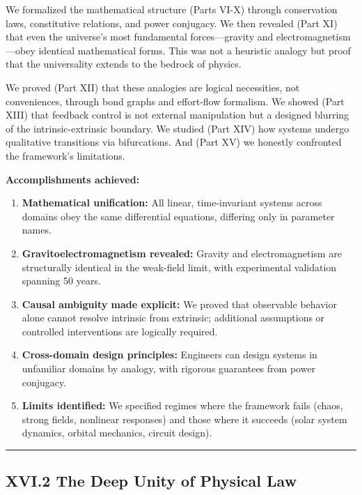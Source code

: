 \documentclass[
]{article}
\begin{document}
We formalized the mathematical structure (Parts VI-X) through
conservation laws, constitutive relations, and power conjugacy. We then
revealed (Part XI) that even the universe's most fundamental
forces---gravity and electromagnetism---obey identical mathematical
forms. This was not a heuristic analogy but proof that the universality
extends to the bedrock of physics.

We proved (Part XII) that these analogies are logical necessities, not
conveniences, through bond graphs and effort-flow formalism. We showed
(Part XIII) that feedback control is not external manipulation but a
designed blurring of the intrinsic-extrinsic boundary. We studied (Part
XIV) how systems undergo qualitative transitions via bifurcations. And
(Part XV) we honestly confronted the framework's limitations.

\textbf{Accomplishments achieved:}

\begin{enumerate}
\def\labelenumi{\arabic{enumi}.}
\item
  \textbf{Mathematical unification:} All linear, time-invariant systems
  across domains obey the same differential equations, differing only in
  parameter names.
\item
  \textbf{Gravitoelectromagnetism revealed:} Gravity and
  electromagnetism are structurally identical in the weak-field limit,
  with experimental validation spanning 50 years.
\item
  \textbf{Causal ambiguity made explicit:} We proved that observable
  behavior alone cannot resolve intrinsic from extrinsic; additional
  assumptions or controlled interventions are logically required.
\item
  \textbf{Cross-domain design principles:} Engineers can design systems
  in unfamiliar domains by analogy, with rigorous guarantees from power
  conjugacy.
\item
  \textbf{Limits identified:} We specified regimes where the framework
  fails (chaos, strong fields, nonlinear responses) and those where it
  succeeds (solar system dynamics, orbital mechanics, circuit design).
\end{enumerate}

\begin{center}\rule{0.5\linewidth}{0.5pt}\end{center}

\subsection{XVI.2 The Deep Unity of Physical
Law}\label{xvi.2-the-deep-unity-of-physical-law}
\end{document}

